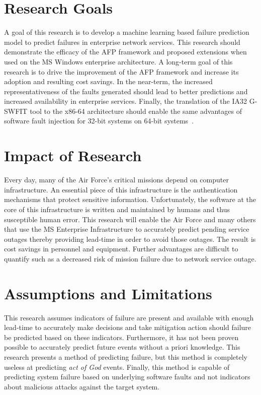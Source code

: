 \section{Research Goals} 
A goal of this research is to develop a machine learning based failure
prediction model to predict failures in enterprise network services.  This
research should demonstrate the efficacy of the \ac{AFP} framework and proposed
extensions when used on the \ac{MS} Windows enterprise architecture.  A
long-term goal of this research is to drive the improvement of the \ac{AFP}
framework and increase its adoption and resulting cost savings.  In the
near-term, the increased representativeness of the faults generated should lead
to better predictions and increased availability in enterprise services.
Finally, the translation of the IA32 \ac{G-SWFIT} tool to the x86-64
architecture should enable the same advantages of software fault injection for
32-bit systems on 64-bit systems~\cite{gswfit}.

\section{Impact of Research}
Every day, many of the Air Force's critical missions depend on computer
infrastructure.  An essential piece of this infrastructure is the
authentication mechanisms that protect  sensitive information.  Unfortunately,
the software at the core of this infrastructure is written and maintained by
humans and thus susceptible human error.  This research will enable the Air
Force and many others that use the \ac{MS} Enterprise Infrastructure to
accurately predict pending service outages thereby providing lead-time in order
to avoid those outages.  The result is cost savings in personnel and equipment.
Further advantages are difficult to quantify such as a decreased risk of
mission failure due to network service outage.

\section{Assumptions and Limitations}
This research assumes indicators of failure are present and available with
enough lead-time to accurately make decisions and take mitigation action should
failure be predicted based on these indicators.  Furthermore, it has not been
proven possible to accurately predict future events without a priori knowledge.
This research presents a method of predicting failure, but this method is
completely useless at predicting \emph{act of God} events.  Finally, this
method is capable of predicting system failure based on underlying software
faults and not indicators about malicious attacks against the target system.

